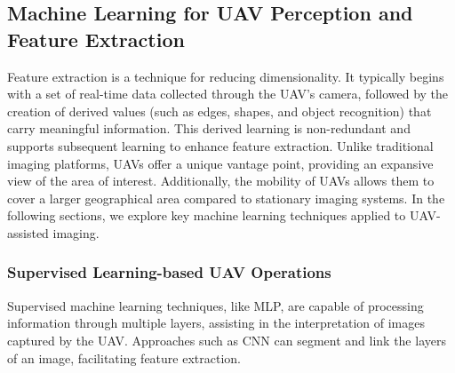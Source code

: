 
\subsection{Machine Learning for UAV Perception and Feature Extraction}


Feature extraction is a technique for reducing dimensionality. It typically begins with a set of real-time data collected through the UAV's camera, followed by the creation of derived values (such as edges, shapes, and object recognition) that carry meaningful information. This derived learning is non-redundant and supports subsequent learning to enhance feature extraction. Unlike traditional imaging platforms, UAVs offer a unique vantage point, providing an expansive view of the area of interest. Additionally, the mobility of UAVs allows them to cover a larger geographical area compared to stationary imaging systems. In the following sections, we explore key machine learning techniques applied to UAV-assisted imaging.


\subsubsection{Supervised Learning-based UAV Operations}



Supervised machine learning techniques, like MLP, are capable of processing information through multiple layers, assisting in the interpretation of images captured by the UAV. Approaches such as CNN can segment and link the layers of an image, facilitating feature extraction.

